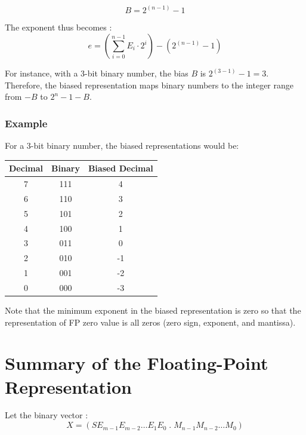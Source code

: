 \documentclass[12pt,openany]{book}
\begin{document}
			      	\[
			      		B = 2^{(n-1)} - 1
			      	\]
			      	
			      	
			      	The exponent thus becomes : 
			      	\[ e = (\sum_{i=0}^{n-1} E_i \cdot 2^i) - (2^{(n-1)} - 1) \]
			      	
			      	For instance, with a 3-bit binary number, the bias $B$ is $2^{(3-1)} - 1 = 3$. Therefore, the biased representation maps binary numbers to the integer range from $-B$ to $2^n - 1 - B$.
			      	
			      	\subsubsection{Example}
			      	
			      	For a 3-bit binary number, the biased representations would be:
			      	
			      	\begin{center}
			      		\begin{tabular}{ccc}
			      			\textbf{Decimal} & \textbf{Binary} & \textbf{Biased Decimal} \\
			      			\hline
			      			7                & 111             & 4                       \\
			      			6                & 110             & 3                       \\
			      			5                & 101             & 2                       \\
			      			4                & 100             & 1                       \\
			      			3                & 011             & 0                       \\
			      			2                & 010             & -1                      \\
			      			1                & 001             & -2                      \\
			      			0                & 000             & -3                      \\
			      		\end{tabular}
			      	\end{center}
			      	
			      	Note that the minimum exponent in the biased representation is zero so that the representation of FP zero value is all zeros (zero sign, exponent, and mantissa).
			      	
			      	\newpage
			      	\section*{Summary of the Floating-Point Representation}
			      	Let the binary vector : 
			      	\[ X = (S E_{m-1}E_{m-2}\dots E_1E_0 \; . \; M_{n-1}M_{n-2}\dots M_0) \]
			      	
\end{document}
